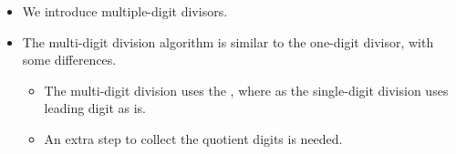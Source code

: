 \begin{frame}
\begin{itemize}
\item We introduce multiple-digit divisors. 
\item The multi-digit division algorithm is similar to the one-digit divisor, with some differences.
\begin{itemize}
\item The multi-digit division uses the , where as the single-digit division uses leading digit as is.
\item An extra step to collect the quotient digits is needed.
\end{itemize}
\end{itemize}
\end{frame}